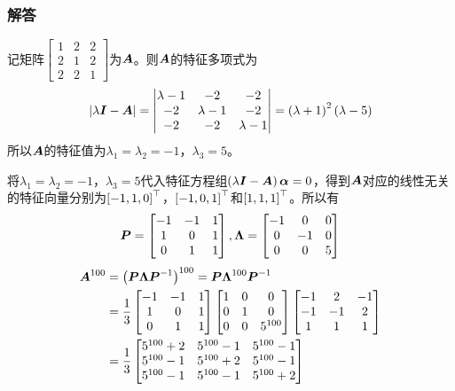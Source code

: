\documentclass{beamer}
\begin{document}
\begin{frame}[allowframebreaks]
    \frametitle{解答}
    记矩阵\(\begin{bmatrix}1&2&2\\2&1&2\\2&2&1\end{bmatrix}\)为\(\boldsymbol{A}\)。则\(\boldsymbol{A}\)的特征多项式为
    \begin{equation*}
        \left|\lambda\boldsymbol{I}-\boldsymbol{A} \right|=\begin{vmatrix}\lambda-1&-2&-2\\-2&\lambda-1&-2\\-2&-2&\lambda-1\end{vmatrix}=\left( \lambda+1 \right)^2\left( \lambda-5 \right)
    \end{equation*}
    所以\(\boldsymbol{A}\)的特征值为\(\lambda_1=\lambda_2=-1\)，\(\lambda_3=5\)。

    将\(\lambda_1=\lambda_2=-1\)，\(\lambda_3=5\)代入特征方程组\(\left( \lambda\boldsymbol{I}-\boldsymbol{A} \right)\boldsymbol{\alpha}=0\)，得到\(\boldsymbol{A}\)对应的线性无关的特征向量分别为\(\left[ -1,1,0 \right]^\top\)，\(\left[ -1,0,1 \right]^\top\)和\(\left[ 1,1,1 \right]^\top\)。所以有
    \begin{equation*}
        \boldsymbol{P}=\begin{bmatrix}-1&-1&1\\1&0&1\\0&1&1\end{bmatrix},\boldsymbol{\Lambda}=\begin{bmatrix}-1&0&0\\0&-1&0\\0&0&5\end{bmatrix}
    \end{equation*}
    \begin{align*}
        \boldsymbol{A}^{100} & =\left( \boldsymbol{P}\boldsymbol{\Lambda}{\boldsymbol{P}}^{-1} \right)^{100}=\boldsymbol{P}\boldsymbol{\Lambda}^{100}{\boldsymbol{P}}^{-1}                                                                                                   \\
                    & =\frac{1}{3}\begin{bmatrix}-1&-1&1\\1&0&1\\0&1&1\end{bmatrix}\begin{bmatrix}1&0&0\\0&1&0\\0&0&5^{100}\end{bmatrix}\begin{bmatrix}-1&2&-1\\-1&-1&2\\1&1&1\end{bmatrix} \\
                    & =\frac{1}{3}\begin{bmatrix}5^{100}+2&5^{100}-1&5^{100}-1\\5^{100}-1&5^{100}+2&5^{100}-1\\5^{100}-1&5^{100}-1&5^{100}+2\end{bmatrix}
    \end{align*}
\end{frame}
\end{document}
